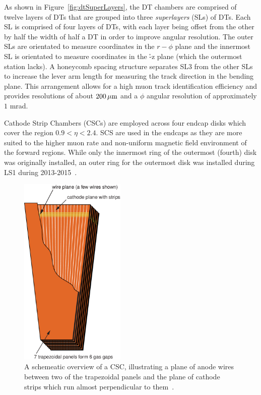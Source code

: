 As shown in Figure~\ref{fig:dtSuperLayers}, the DT chambers are comprised of twelve layers of DTs that are grouped into three \emph{superlayers} (SLs) of DTs.
Each SL is comprised of four layers of DTs, with each layer being offset from the other by half the width of half a DT in order to improve angular resolution.
The outer SLs are orientated to measure coordinates in the $r-\phi$ plane and the innermost SL is orientated to measure coordinates in the \r-z plane (which the outermost station lacks).
A honeycomb spacing structure separates SL3 from the other SLs to increase the lever arm length for measuring the track direction in the bending plane.
This arrangement allows for a high muon track identification efficiency and provides resolutions of about $200\,\mu\text{m}$ and a $\phi$ angular resolution of approximately $1$ mrad.

Cathode Strip Chambers (CSCs) are employed across four endcap disks which cover the region $0.9 < \eta < 2.4$.
SCS are used in the endcaps as they are more suited to the higher muon rate and non-uniform magnetic field environment of the forward regions.
While only the innermost ring of the outermost (fourth) disk was originally installed, an outer ring for the outermost disk was installed during LS1 during 2013-2015~\cite{Battilana:2017mrm}.

\begin{figure}[htb]
\begin{center}
\includegraphics[width=0.45\textwidth]{figs/cms/csc_trapezoid_v1.pdf}
\caption{A schemeatic overview of a CSC, illustrating a plane of anode wires between two of the trapezoidal panels and the plane of cathode strips which run almost perpendicular to them~\cite{Bayatian:2006nff}.}
\label{fig:csc}
\end{center}
\end{figure}


